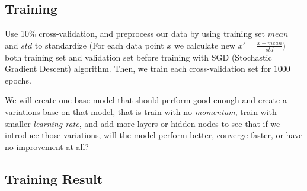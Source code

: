 \documentclass{article}
\begin{document}
\subsection*{Training}
Use 10\% cross-validation, and preprocess our data by using training set $mean$ 
and $std$ to standardize (For each data point $x$ we calculate new 
$x' = \frac{x - mean}{std}$) both training set and validation set before 
training with SGD (Stochastic Gradient Descent) algorithm. 
Then, we train each cross-validation set for $1000$ epochs.

We will create one base model that should perform good enough 
and create a variations base on that model, that is train with no 
\emph{momentum}, train with smaller \emph{learning rate}, and add more 
layers or hidden nodes to see that if we introduce those variations, 
will the model perform better, converge faster, or have no improvement at all?

\subsection*{Training Result}
\end{document}
